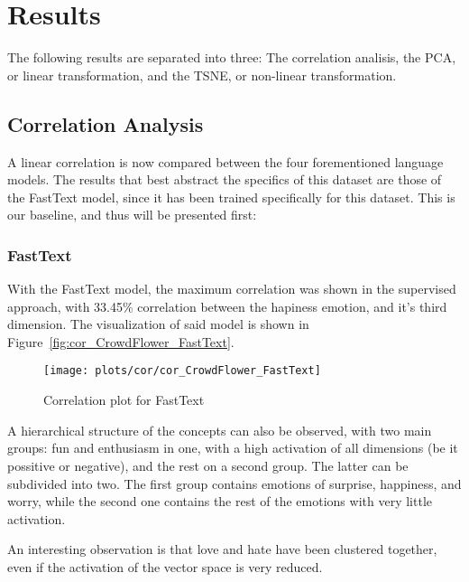 \section{Results}\label{sec:Results}

The following results are separated into three: The correlation analisis, the PCA, or linear transformation, and the TSNE, or non-linear transformation.



\subsection{Correlation Analysis}\label{sub:Correlation Analysis}
A linear correlation is now compared between the four forementioned language models. The results that best abstract the specifics of this dataset are those of the FastText model, since it has been trained specifically for this dataset. This is our baseline, and thus will be presented first:


\subsubsection{FastText}
With the FastText model, the maximum correlation was shown in the supervised approach, with 33.45\% correlation between the hapiness emotion, and it's third dimension. The visualization of said model is shown in Figure~\ref{fig:cor_CrowdFlower_FastText}.

\begin{figure}[H]
  \texttt{[image: plots/cor/cor\_CrowdFlower\_FastText]}
  \centering
  \caption{Correlation plot for FastText}
\end{figure}\label{fig:cor_CrowdFlower_FastText}

A hierarchical structure of the concepts can also be observed, with two main groups: fun and enthusiasm in one, with a high activation of all dimensions (be it possitive or negative), and the rest on a second group. The latter can be subdivided into two. The first group contains emotions of surprise, happiness, and worry, while the second one contains the rest of the emotions with very little activation.

An interesting observation is that love and hate have been clustered together, even if the activation of the vector space is very reduced.

